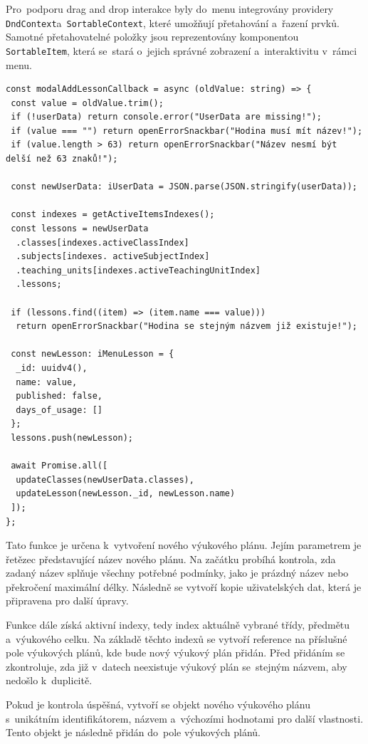 \documentclass[male,czech,api_bc]{kitheses}
\begin{document}
Pro~podporu drag and drop interakce byly do~menu integrovány providery \texttt{DndContext}\break a~\texttt{SortableContext}, které umožňují přetahování a~řazení prvků. Samotné přetahovatelné položky jsou reprezentovány komponentou \texttt{SortableItem}, která se~stará o~jejich správné zobrazení a~interaktivitu v~rámci menu.

\begin{lstlisting}
const modalAddLessonCallback = async (oldValue: string) => {
 const value = oldValue.trim();
 if (!userData) return console.error("UserData are missing!");
 if (value === "") return openErrorSnackbar("Hodina musí mít název!");
 if (value.length > 63) return openErrorSnackbar("Název nesmí být delší než 63 znaků!");

 const newUserData: iUserData = JSON.parse(JSON.stringify(userData));
	
 const indexes = getActiveItemsIndexes();
 const lessons = newUserData
  .classes[indexes.activeClassIndex]
  .subjects[indexes. activeSubjectIndex]
  .teaching_units[indexes.activeTeachingUnitIndex]
  .lessons;
	
 if (lessons.find((item) => (item.name === value)))
  return openErrorSnackbar("Hodina se stejným názvem již existuje!");
	
 const newLesson: iMenuLesson = {
  _id: uuidv4(),
  name: value,
  published: false,
  days_of_usage: []
 };
 lessons.push(newLesson);

 await Promise.all([
  updateClasses(newUserData.classes),
  updateLesson(newLesson._id, newLesson.name)
 ]);
};
\end{lstlisting}

Tato funkce je určena k~vytvoření nového výukového plánu. Jejím parametrem je řetězec představující název nového plánu. Na začátku probíhá kontrola, zda zadaný název splňuje všechny potřebné podmínky, jako je prázdný název nebo překročení maximální délky. Následně se vytvoří kopie uživatelských dat, která je připravena pro další úpravy.

Funkce dále získá aktivní indexy, tedy index aktuálně vybrané třídy, předmětu a~výukového celku. Na základě těchto indexů se vytvoří reference na příslušné pole výukových plánů, kde bude nový výukový plán přidán. Před přidáním se zkontroluje, zda již v~datech neexistuje výukový plán se~stejným názvem, aby nedošlo k~duplicitě.

\newpage

Pokud je kontrola úspěšná, vytvoří se objekt nového výukového plánu s~unikátním identifikátorem, názvem a~výchozími hodnotami pro další vlastnosti. Tento objekt je následně přidán do~pole výukových plánů.
\end{document}
